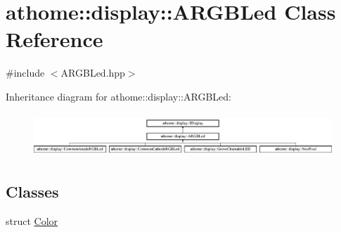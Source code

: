 \hypertarget{classathome_1_1display_1_1_a_r_g_b_led}{}\section{athome\+:\+:display\+:\+:A\+R\+G\+B\+Led Class Reference}
\label{classathome_1_1display_1_1_a_r_g_b_led}


{\ttfamily \#include $<$A\+R\+G\+B\+Led.\+hpp$>$}

Inheritance diagram for athome\+:\+:display\+:\+:A\+R\+G\+B\+Led\+:\begin{figure}[H]
\begin{center}
\leavevmode
\includegraphics[height=1.660079cm]{classathome_1_1display_1_1_a_r_g_b_led}
\end{center}
\end{figure}
\subsection*{Classes}
\begin{DoxyCompactItemize}
\item 
struct \mbox{\hyperlink{structathome_1_1display_1_1_a_r_g_b_led_1_1_color}{Color}}
\end{DoxyCompactItemize}
